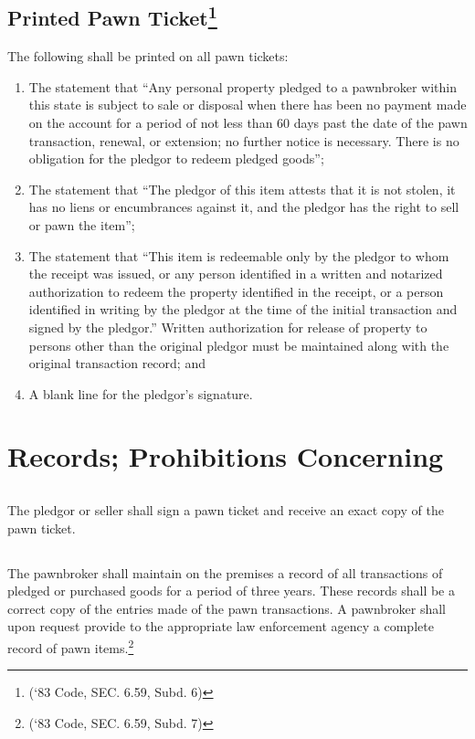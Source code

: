 \subsection{Printed Pawn Ticket\footnote{(‘83 Code, SEC. 6.59, Subd. 6)}}
The following shall be printed on all pawn tickets:
\begin{enumerate}[{\indent}1)]
    \item The statement that “Any personal property pledged to a pawnbroker within this state is subject to sale or disposal when there has been no payment made on the account for a period of not less than 60 days past the date of the pawn transaction, renewal, or extension; no further notice is necessary.  There is no obligation for the pledgor to redeem pledged goods”;
    \item The statement that “The pledgor of this item attests that it is not stolen, it has no liens or encumbrances against it, and the pledgor has the right to sell or pawn the item”;
    \item The statement that “This item is redeemable only by the pledgor to whom the receipt was issued, or any person identified in a written and notarized authorization to redeem the property identified in the receipt, or a person identified in writing by the pledgor at the time of the initial transaction and signed by the pledgor.” Written authorization for release of property to persons other than the original pledgor must be maintained along with the original transaction record; and
    \item A blank line for the pledgor’s signature.
\end{enumerate}

\section{Records; Prohibitions Concerning}
\subsection{}
The pledgor or seller shall sign a pawn ticket and receive an exact copy of the pawn ticket.
\subsection{}
The pawnbroker shall maintain on the premises a record of all transactions of pledged or purchased goods for a period of three years.  These records shall be a correct copy of the entries made of the pawn transactions.  A pawnbroker shall upon request provide to the appropriate law enforcement agency a complete record of pawn items.\footnote{(‘83 Code, SEC. 6.59, Subd. 7)}
